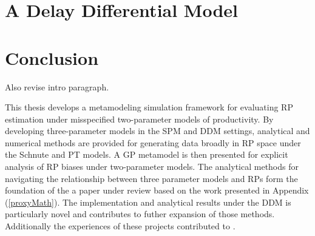 \documentclass[12pt]{ucscthesis}
\begin{document}
%
\chapter{A Delay Differential Model \label{delayChapter}}


%
\chapter{\color{red}Conclusion}
\clearpage

%


%
{\color{blue}
{\color{red} Also revise intro paragraph.} 

This thesis develops a metamodeling simulation framework for evaluating RP estimation 
under misspecified two-parameter models of productivity. By developing three-parameter 
models in the SPM and DDM settings, analytical and numerical methods are provided for 
generating data broadly in RP space under the Schnute and PT models. A GP metamodel is 
then presented for explicit analysis of RP biases under two-parameter models. The analytical 
methods for navigating the relationship between three parameter models and RPs form the 
foundation of the a paper under review based on the work presented in Appendix (\ref{proxyMath}). 
The implementation and analytical results under the DDM is particularly novel and 
contributes to futher expansion of those methods. Additionally the experiences 
of these projects contributed to \cite{dick_stock_2023}.   
}
\end{document}
